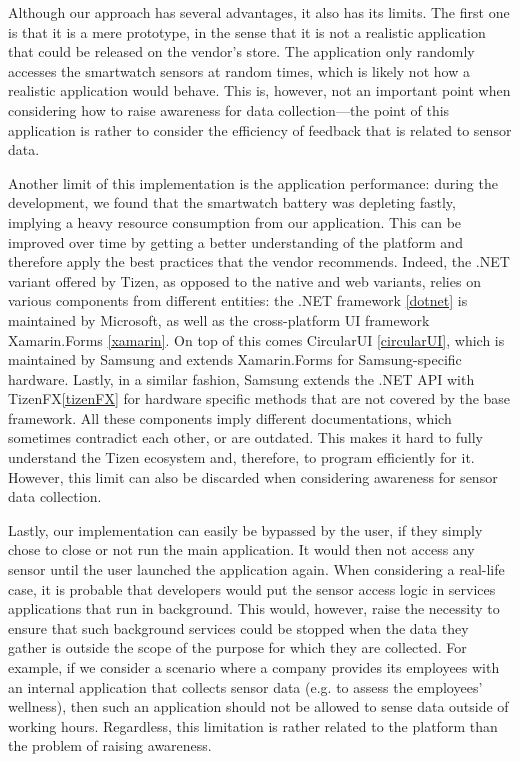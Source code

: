 \documentclass[conference, a4paper, 10pt, twocolumn]{IEEEtran}
\begin{document}
Although our approach has several advantages, it also has its limits. The first one is that it is a mere prototype, in the sense that it is not a realistic application that could be released on the vendor's store. The application only randomly accesses the smartwatch sensors at random times, which is likely not how a realistic application would behave. This is, however, not an important point when considering how to raise awareness for data collection---the point of this application is rather to consider the efficiency of feedback that is related to sensor data.  

Another limit of this implementation is the application performance: during the development, we found that the smartwatch battery was depleting fastly, implying a heavy resource consumption from our application. This can be improved over time by getting a better understanding of the platform and therefore apply the best practices that the vendor recommends. Indeed, the .NET variant offered by Tizen, as opposed to the native and web variants, relies on various components from different entities: the .NET framework \ref{dotnet} is maintained by Microsoft, as well as the cross-platform UI framework Xamarin.Forms \ref{xamarin}. On top of this comes CircularUI \ref{circularUI}, which is maintained by Samsung and extends Xamarin.Forms for Samsung-specific hardware. Lastly, in a similar fashion, Samsung extends the .NET \ac{API} with TizenFX\ref{tizenFX} for hardware specific methods that are not covered by the base framework. All these components imply different documentations, which sometimes contradict each other, or are outdated. This makes it hard to fully understand the Tizen ecosystem and, therefore, to program efficiently for it. However, this limit can also be discarded when considering awareness for sensor data collection.

Lastly, our implementation can easily be bypassed by the user, if they simply chose to close or not run the main application. It would then not access any sensor until the user launched the application again. When considering a real-life case, it is probable that developers would put the sensor access logic in services applications that run in background. This would, however, raise the necessity to ensure that such background services could be stopped when the data they gather is outside the scope of the purpose for which they are collected. For example, if we consider a scenario where a company provides its employees with an internal application that collects sensor data (e.g. to assess the employees' wellness), then such an application should not be allowed to sense data outside of working hours. Regardless, this limitation is rather related to the platform than the problem of raising awareness. 
\end{document}
